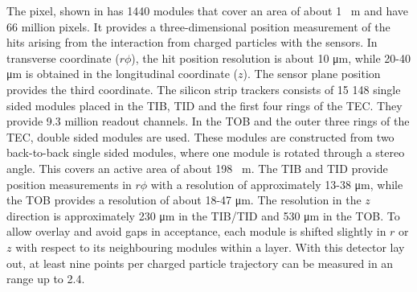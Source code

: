  
 The pixel, shown in  has 1440 modules that cover an area of about 1 \si{ \squared \meter} and have 66 million pixels. It provides a three-dimensional position measurement of the hits arising from the interaction from charged particles with the sensors. In transverse coordinate ($r\phi$), the hit position resolution is about 10 \si{ \micro \meter}, while 20-40 \si{ \micro \meter} is obtained in the longitudinal coordinate ($z$). The sensor plane position provides the third coordinate. 
  The silicon strip trackers consists of 15 148 single sided modules placed in the TIB, TID and the first four rings of the TEC. They provide 9.3 million readout channels. In the TOB and the outer three rings of the TEC, double sided modules are used. These modules are constructed from two back-to-back single sided modules, where one module is rotated through a stereo angle.  This covers an active area of about 198 \si{ \squared  \meter}. The TIB and TID provide position measurements in $r\phi$ with a resolution of approximately 13-38 \si{ \micro \meter}, while the TOB provides a resolution of about 18-47 \si{ \micro \meter}. The resolution in the  $z$ direction is approximately 230  \si{ \micro \meter} in the TIB/TID and 530  \si{ \micro \meter} in the TOB. To allow overlay and avoid gaps in acceptance, each module is shifted slightly in $r$ or $z$ with respect to its neighbouring modules within a layer.  With this detector lay out, at least nine points per charged particle trajectory can be measured in an \abspsrap range up to 2.4.
  
